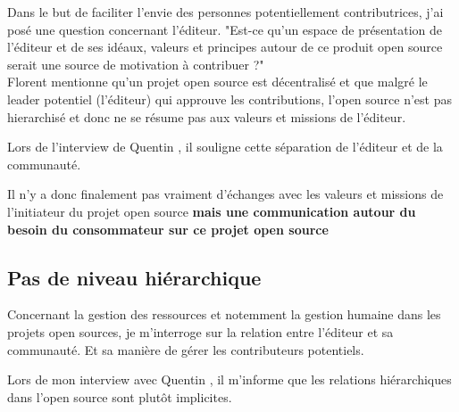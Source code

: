 			Dans le but de faciliter l'envie des personnes potentiellement contributrices, j'ai posé une question concernant l'éditeur. "Est-ce qu'un espace de présentation de l'éditeur et de ses idéaux, valeurs et principes autour de ce produit open source serait une source de motivation à contribuer ?"\\

			Florent  mentionne qu'un projet open source est décentralisé et que malgré le leader potentiel (l'éditeur) qui approuve les contributions, l'open source n'est pas hierarchisé et donc ne se résume pas aux valeurs et missions de l'éditeur.

			\begin{center}
				\textit{
				}
			\end{center}

			Lors de l'interview de Quentin , il souligne cette séparation de l'éditeur et de la communauté.
			\begin{center}
				\textit{
				}
			\end{center}

			Il n'y a donc finalement pas vraiment d'échanges avec les valeurs et missions de l'initiateur du projet open source \textbf{mais une communication autour du besoin du consommateur sur ce projet open source}

		\subsection{Pas de niveau hiérarchique}

			Concernant la gestion des ressources et notemment la gestion humaine dans les projets open sources, je m'interroge sur la relation entre l'éditeur et sa communauté. Et sa manière de gérer les contributeurs potentiels.

			Lors de mon interview avec Quentin , il m'informe que les relations hiérarchiques dans l'open source sont plutôt implicites.

